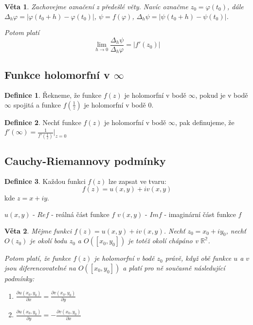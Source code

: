 \documentclass[a4]{report}
\newtheorem{theorem}{Věta}
\theoremstyle{definition}
\newtheorem{definition}{Definice}[section]
\begin{document}
\begin{theorem}
Zachovejme označení z předešlé věty. Navíc označme $z_0=\varphi(t_0)$, dále $\Delta_h\varphi=|\varphi(t_0+h)-\varphi(t_0)|$, $\psi = f(\varphi)$, $\Delta_h\psi=|\psi(t_0+h)-\psi(t_0)|$.

Potom platí $$\lim_{h\to 0}\frac{\Delta_h\psi}{\Delta_h\varphi}=|f'(z_0)|$$
\end{theorem}

\subsection{Funkce holomorfní v $\infty$}
\begin{definition}
Řekneme, že funkce $f(z)$ je holomorfní v bodě $\infty$, pokud je v bodě $\infty$ spojitá a funkce $f(\frac{1}{z})$ je holomorfní v bodě $0$.
\end{definition}

\begin{definition}
Nechť funkce $f(z)$ je holomorfní v bodě $\infty$, pak definujeme, že $f'(\infty)=\frac{1}{f'(\frac{1}{z})}|_{z=0}$
\end{definition}

\subsection{Cauchy-Riemannovy podmínky}
\begin{definition}
Každou funkci $f(z)$ lze zapsat ve tvaru: $$f(z)=u(x,y)+i v(x,y)$$ kde $z=x+iy$. 

$u(x,y)$ - $Re f$ - reálná část funkce $f$
$v(x,y)$ - $Im f$ - imaginární část funkce $f$
\end{definition}

\begin{theorem}
Mějme funkci $f(z)=u(x,y)+i v(x,y)$. Nechť $z_0=x_0+i y_0$, nechť $O(z_0)$ je okolí bodu $z_0$ a $O([x_0,y_0])$ je totéž okolí chápáno v $\mathbb{R^2}$.

Potom platí, že funkce $f(z)$ je holomorfní v bodě $z_0$ právě, když obě funkce $u$ a $v$ jsou diferencovatelné na $O([x_0,y_0])$ a platí pro ně současně následující podmínky:
\begin{enumerate}
\item $\frac{\partial u(x_0,y_0)}{\partial x}=\frac{\partial v(x_0,y_0)}{\partial y}$
\item $\frac{\partial u(x_0,y_0)}{\partial y}=-\frac{\partial v(x_0,y_0)}{\partial x}$
\end{enumerate}
\end{theorem}
\end{document}
